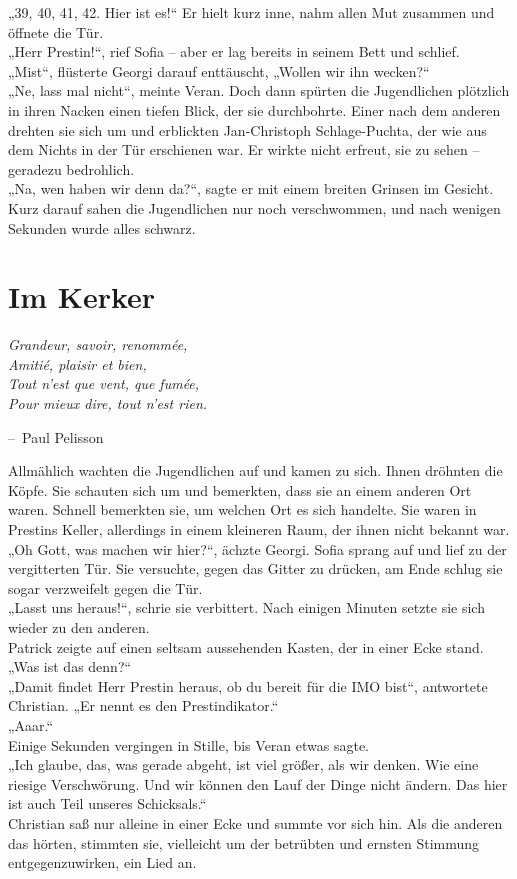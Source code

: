 \documentclass[oneside]{memoir}
\makeatletter
\newenvironment{chapquote}[2][2em]
  {\setlength{\@tempdima}{#1}%
   \def\chapquote@author{#2}%
   \parshape 1 \@tempdima \dimexpr\textwidth-2\@tempdima\relax%
   \itshape}
  {\par\normalfont\hfill--\ \chapquote@author\hspace*{\@tempdima}\par\bigskip}
\makeatother
\begin{document}
„39, 40, 41, 42. Hier ist es!“
Er hielt kurz inne, nahm allen Mut zusammen und öffnete die Tür. \\
„Herr Prestin!“, rief Sofia – aber er lag bereits in seinem Bett und schlief. \\
„Mist“, flüsterte Georgi darauf enttäuscht, „Wollen wir ihn wecken?“ \\
„Ne, lass mal nicht“, meinte Veran.
Doch dann spürten die Jugendlichen plötzlich in ihren Nacken einen tiefen Blick, der sie durchbohrte. Einer nach dem anderen drehten sie sich um und erblickten Jan-Christoph Schlage-Puchta, der wie aus dem Nichts in der Tür erschienen war. Er wirkte nicht erfreut, sie zu sehen – geradezu bedrohlich. \\
„Na, wen haben wir denn da?“, sagte er mit einem breiten Grinsen im Gesicht. Kurz darauf sahen die Jugendlichen nur noch verschwommen, und nach wenigen Sekunden wurde alles schwarz.

     
     
\chapter{Im Kerker} %
\begin{chapquote}{Paul Pelisson}
\glqq Grandeur, savoir, renommée, \\
Amitié, plaisir et bien, \\
Tout n’est que vent, que fumée, \\
Pour mieux dire, tout n’est rien.\grqq
\end{chapquote}

Allmählich wachten die Jugendlichen auf und kamen zu sich. Ihnen dröhnten die Köpfe. Sie schauten sich um und bemerkten, dass sie an einem anderen Ort waren. Schnell bemerkten sie, um welchen Ort es sich handelte. Sie waren in Prestins Keller, allerdings in einem kleineren Raum, der ihnen nicht bekannt war. \\
„Oh Gott, was machen wir hier?“, ächzte Georgi. 
Sofia sprang auf und lief zu der vergitterten Tür. Sie versuchte, gegen das Gitter zu drücken, am Ende schlug sie sogar verzweifelt gegen die Tür. \\
„Lasst uns heraus!“, schrie sie verbittert. Nach einigen Minuten setzte sie sich wieder zu den anderen. \\
Patrick zeigte auf einen seltsam aussehenden Kasten, der in einer Ecke stand. \\
„Was ist das denn?“ \\
„Damit findet Herr Prestin heraus, ob du bereit für die IMO bist“, antwortete Christian. „Er nennt es den Prestindikator.“ \\
„Aaar.“ \\
Einige Sekunden vergingen in Stille, bis Veran etwas sagte. \\
„Ich glaube, das, was gerade abgeht, ist viel größer, als wir denken. Wie eine riesige Verschwörung. Und wir können den Lauf der Dinge nicht ändern. Das hier ist auch Teil unseres Schicksals.“ \\
Christian saß nur alleine in einer Ecke und summte vor sich hin. Als die anderen das hörten, stimmten sie, vielleicht um der betrübten und ernsten Stimmung entgegenzuwirken, ein Lied an. \\
\end{document}
